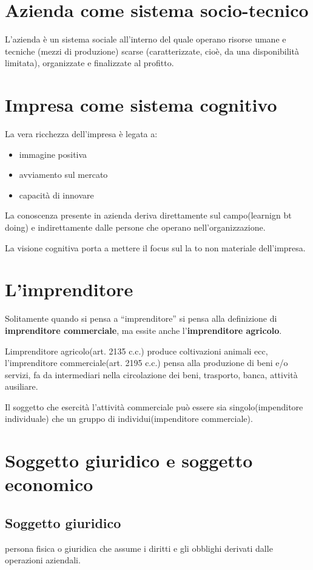 \section{Azienda come sistema socio-tecnico}

L’azienda è un sistema sociale all’interno del quale
operano risorse umane e tecniche (mezzi di produzione)
scarse (caratterizzate, cioè, da una disponibilità limitata),
organizzate e finalizzate al profitto.

\section{Impresa come sistema cognitivo}

La vera ricchezza dell'impresa è legata a:
\begin{itemize}
    \item immagine positiva
    \item avviamento sul mercato
    \item capacità di innovare
\end{itemize}

La conoscenza presente in azienda deriva direttamente sul campo(learnign bt doing)
e indirettamente dalle persone che operano nell'organizzazione.

La visione cognitiva porta a mettere il focus sul la to 
non materiale dell'impresa.

\section{L'imprenditore}
Solitamente quando si pensa a ``imprenditore'' si pensa 
alla definizione di \textbf{imprenditore commerciale}, ma essite anche 
l'\textbf{imprenditore agricolo}.

Limprenditore agricolo(art. 2135 c.c.) produce coltivazioni animali ecc,
l'imprenditore commerciale(art. 2195 c.c.) pensa alla produzione 
di beni e/o servizi, fa da intermediari nella circolazione
dei beni, trasporto, banca, attività ausiliare.

Il soggetto che esercità l'attività commerciale può essere sia singolo(impenditore individuale)
che un gruppo di individui(impenditore commerciale).

\section{Soggetto giuridico e soggetto economico}

\subsection{Soggetto giuridico}
persona fisica o giuridica che assume i diritti 
e gli obblighi derivati dalle operazioni aziendali.

